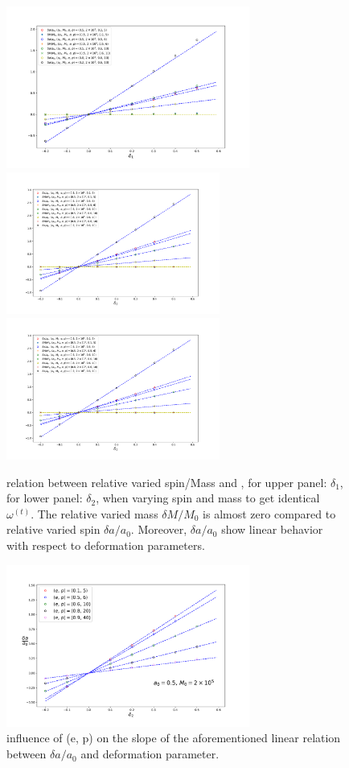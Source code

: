 \documentclass{article}
\begin{document}
\begin{figure}[!htb]
	\centering
	\includegraphics[width=8cm]{d1_spin_linear.png}
	\includegraphics[width=7cm]{d2_spin_linear.png}
	\includegraphics[width=7cm]{d2_spin_linear.png}
	\caption{relation between relative varied spin/Mass and , for upper panel: $\delta_1$, for lower panel: $\delta_2$, when varying spin and mass to get identical $\omega^{(t)}$. The relative varied mass $\delta M/ M_0$ is almost zero compared to relative varied spin $\delta a/ a_0$. Moreover, $\delta a/ a_0$ show linear behavior with respect to deformation parameters.}
	\label{da_linear}
\end{figure}

\begin{figure}[!htb]
	\centering
	\includegraphics[width=8cm]{d2_deltaspin_ep.png}
	
	\caption{influence of (e, p) on the slope of the aforementioned linear relation between $\delta a/a_0$ and deformation parameter. }
	\label{ep_slope}
\end{figure}
\end{document}
